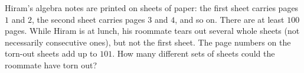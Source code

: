 Hiram's algebra notes are printed on sheets of paper: the first sheet carries pages $1$ and $2$, the second sheet carries pages $3$ and $4$, and so on. There are at least $100$ pages. While Hiram is at lunch, his roommate tears out several whole sheets (not necessarily consecutive ones), but not the first sheet. The page numbers on the torn-out sheets add up to $101$. How many different sets of sheets could the roommate have torn out?
